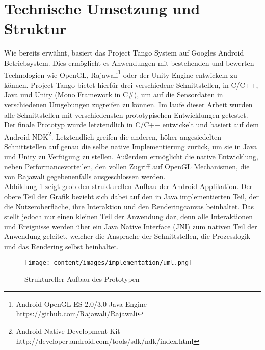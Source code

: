 \section{Technische Umsetzung und Struktur} \label{eq:technic}

Wie bereits erwähnt, basiert das Project Tango System auf Googles Android Betriebsystem. Dies ermöglicht es Anwendungen mit bestehenden und bewerten Technologien wie OpenGL, Rajawali\footnote{Android OpenGL ES 2.0/3.0 Java Engine - https://github.com/Rajawali/Rajawali} oder der Unity Engine entwickeln zu können. Project Tango bietet hierfür drei verschiedene Schnittstellen, in C/C++, Java und Unity (Mono Framework in C\#), um auf die Sensordaten in verschiedenen Umgebungen zugreifen zu können. Im laufe dieser Arbeit wurden alle Schnittstellen mit verschiedensten prototypischen Entwicklungen getestet.\\

Der finale Prototyp wurde letztendlich in C/C++ entwickelt und basiert auf dem Android NDK\footnote{Android Native Development Kit - http://developer.android.com/tools/sdk/ndk/index.html}. Letztendlich greifen die anderen, höher angesiedelten Schnittstellen auf genau die selbe native Implementierung zurück, um sie in Java und Unity zu Verfügung zu stellen. Außerdem ermöglicht die native Entwicklung, neben Performancevorteilen, den vollen Zugriff auf OpenGL Mechanismen, die von Rajawali gegebenenfalls ausgeschlossen werden.\\

Abbildung \ref{fig:structure} zeigt grob den strukturellen Aufbau der Android Applikation. Der obere Teil der Grafik bezieht sich dabei auf den in Java implementierten Teil, der die Nutzeroberfläche, ihre Interaktion und den Renderingcanvas beinhaltet. Das stellt jedoch nur einen kleinen Teil der Anwendung dar, denn alle Interaktionen und Ereignisse werden über ein Java Native Interface (JNI) zum nativen Teil der Anwendung geleitet, welcher die Ansprache der Schnittstellen, die Prozesslogik und das Rendering selbst beinhaltet. \\

\begin{figure}[h]
  \centering
	\texttt{[image: content/images/implementation/uml.png]} 
  \caption{Struktureller Aufbau des Prototypen}
  \label{fig:structure}
\end{figure}

